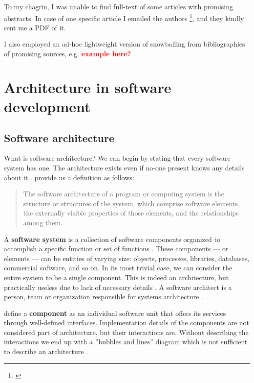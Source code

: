 \documentclass[utf8,english]{gradu3}
\newcommand{\todo}[1]{\textbf{\textcolor{red}{#1}}}
\begin{document}
To my chagrin, I was unable to find full-text of some articles with promising
abstracts.
In case of one specific article I emailed the authors
\footnote{\textcite{Bogner2018}}, and they kindly sent me a PDF of it.

I also employed an ad-hoc lightweight version of snowballing from bibliographies
of promising sources, e.g. \todo{example here?}

\section{Architecture in software development}

\subsection{Software architecture}

What is software architecture? We can begin by stating that every software
system has one. The architecture exists even if no-one present knows any details
about it \parencite[24]{Bass1998}. \textcite[23]{Bass1998} provide us a
definition as follows:

\begin{quote}
  The software architecture of a program or computing system is the structure or
  structures of the system, which comprise software elements, the externally
  visible properties of those elements, and the relationships among them.
\end{quote}

A \textbf{software system} is a collection of software components organized to
accomplish a specific function or set of functions \parencite[3]{IEEE42010}.
These components --- or elements --- can be entities of varying size: objects,
processes, libraries, databases, commercial software, and so on. In its most
trivial case, we can consider the entire system to be a single component. This
is indeed an architecture, but practically useless due to lack of necessary
details \parencite[24]{Bass1998}. A software architect is a person, team or
organization responsible for systems architecture \parencite[3]{IEEE42010}.

\textcite[53]{Koskimies2005} define a \textbf{component} as an individual
software unit that offers its services through well-defined interfaces.
Implementation details of the components are not considered part of
architecture, but their interactions are. Without describing the interactions we
end up with a ''bubbles and lines'' diagram which is not sufficient to describe
an architecture \parencite[24]{Bass1998}.
\end{document}
